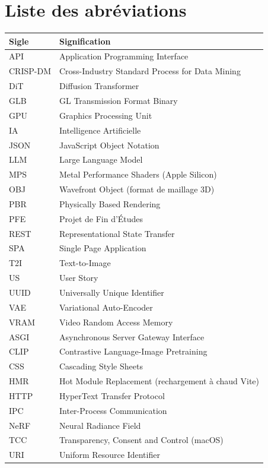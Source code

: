 \documentclass[12pt,a4paper,oneside]{report}
\newcommand{\theadrow}{\rowcolor{tekupblue!12}}
\begin{document}
\chapter*{Liste des abréviations}
\begin{tabular}{@{}p{2.8cm}p{11cm}@{}}
\toprule
\theadrow
\textbf{Sigle} & \textbf{Signification} \\\midrule
API       & Application Programming Interface \\
CRISP-DM  & Cross-Industry Standard Process for Data Mining \\
DiT       & Diffusion Transformer \\
GLB       & GL Transmission Format Binary \\
GPU       & Graphics Processing Unit \\
IA        & Intelligence Artificielle \\
JSON      & JavaScript Object Notation \\
LLM       & Large Language Model \\
MPS       & Metal Performance Shaders (Apple Silicon) \\
OBJ       & Wavefront Object (format de maillage 3D) \\
PBR       & Physically Based Rendering \\
PFE       & Projet de Fin d'Études \\
REST      & Representational State Transfer \\
SPA       & Single Page Application \\
T2I       & Text-to-Image \\
US        & User Story \\
UUID      & Universally Unique Identifier \\
VAE       & Variational Auto-Encoder \\
VRAM      & Video Random Access Memory \\
\midrule
ASGI      & Asynchronous Server Gateway Interface \\
CLIP      & Contrastive Language-Image Pretraining~\cite{radford2021clip} \\
CSS       & Cascading Style Sheets \\
HMR       & Hot Module Replacement (rechargement à chaud Vite) \\
HTTP      & HyperText Transfer Protocol \\
IPC       & Inter-Process Communication \\
NeRF      & Neural Radiance Field \\
TCC       & Transparency, Consent and Control (macOS) \\
URI       & Uniform Resource Identifier \\
\bottomrule
\end{tabular}
\end{document}
